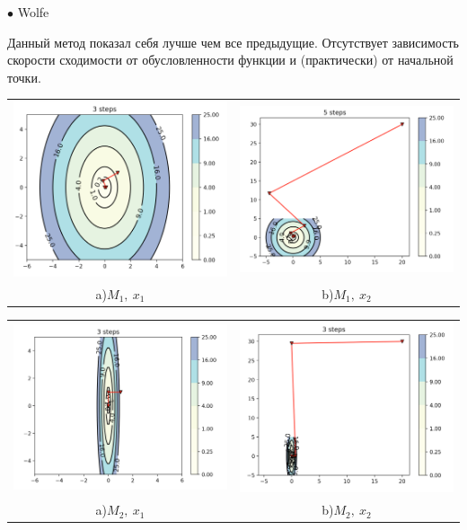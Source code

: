 \documentclass{article}
\theoremstyle{definition}
\theoremstyle{remark}
\begin{document}
$\bullet$ Wolfe

Данный метод показал себя лучше чем все предыдущие. Отсутствует зависимость скорости сходимости от обусловленности функции и (практически) от начальной точки.

\begin{center}
\begin{tabular}{cc}
\includegraphics[width=0.49\linewidth]{19.png} &
\includegraphics[width=0.49\linewidth]{110.png} \\
 a)$M_1,\ x_1$ & b)$M_1,\ x_2$\\
\end{tabular}
\end{center}

\begin{center}
\begin{tabular}{cc}
\includegraphics[width=0.49\linewidth]{111.png} &
\includegraphics[width=0.49\linewidth]{112.png} \\
 a)$M_2,\ x_1$ & b)$M_2,\ x_2$\\
\end{tabular}
\end{center}
\end{document}
